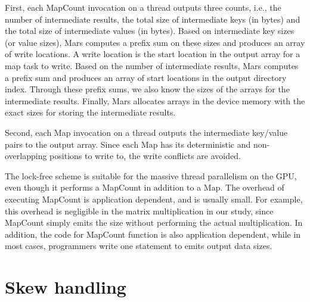 First, each MapCount invocation on a thread outputs three counts, i.e.,
the number of intermediate results, the total size of intermediate keys (in bytes)
and the total size of intermediate values (in bytes).
Based on intermediate key sizes (or value sizes),
Mars computes a prefix sum on these sizes and produces an array of write locations.
A write location is the start location in the output array for a map task to write.
Based on the number of intermediate results,
Mars computes a prefix sum and produces an array of start locations in the output
directory index.
Through these prefix sums, we also know the sizes of the arrays for the intermediate
results.
Finally, Mars allocates arrays in the device memory with the exact sizes for
storing the intermediate results.

Second, each Map invocation on a thread outputs the intermediate key/value pairs to
the output array.
Since each Map has its deterministic and non-overlapping positions to write to,
the write conflicts are avoided.


The lock-free scheme is suitable for the massive thread parallelism on the GPU, even
though it performs a MapCount in addition to a Map. The overhead of executing MapCount
is application dependent, and is usually small. For example, this overhead is negligible
in the matrix multiplication in our study, since MapCount simply emits the size without
performing the actual multiplication. In addition, the code for MapCount function is also application dependent, while in most cases, programmers write one statement to emits output data sizes. 


\section{Skew handling} \label{sec-reduce}

